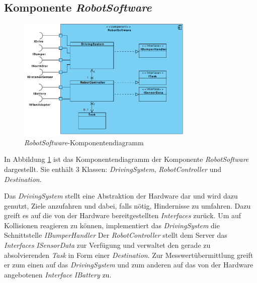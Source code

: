 \subsection{Komponente \textit{RobotSoftware}}
\begin{figure}[H]
\centering
\includegraphics[width=0.75\textwidth]{img/1-Entwurf-5-RobotSoftware}
\caption{\emph{RobotSoftware}-Komponentendiagramm}
\label{KomponentenStruktur2}
\end{figure}
In Abbildung \ref{KomponentenStruktur2} ist das Komponentendiagramm der Komponente \textit{RobotSoftware} dargestellt. Sie enthält 3 Klassen: \textit{DrivingSystem}, \textit{RobotController} und \textit{Destination}.


Das \textit{DrivingSystem} stellt eine Abstraktion der Hardware dar und wird dazu genutzt, Ziele anzufahren und dabei,
falls nötig, Hindernisse zu umfahren. Dazu greift es auf die von der Hardware bereitgestellten \textit{Interfaces} zurück.
Um auf Kollisionen reagieren zu können, implementiert das \textit{DrivingSystem} die Schnittstelle \textit{IBumperHandler}
Der \textit{RobotController} stellt dem Server das \emph{Interfaces} \textit{ISensorData} zur Verfügung und verwaltet den gerade
zu absolvierenden \emph{Task} in Form einer \textit{Destination}. Zur Messwertübermittlung greift er zum einen auf das \textit{DrivingSystem} und zum anderen auf das
von der Hardware angebotenen \textit{Interface} \textit{IBattery} zu.
